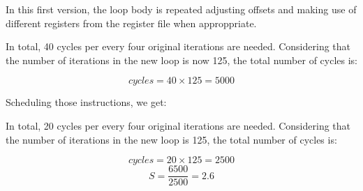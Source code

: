In this first version, the loop body is repeated adjusting offsets
and making use of different registers from the register file when approppriate.

In total, 40 cycles per every four original iterations are needed.
Considering that the number of iterations in the new loop is now 125,
the total number of cycles is:

\[
cycles = 40 \times 125 = 5000
\]

Scheduling those instructions, we get:



In total, 20 cycles per every four original iterations are needed.
Considering that the number of iterations in the new loop is 125,
the total number of cycles is:

\[
cycles = 20 \times 125 = 2500
\]
\[
S = \frac{6500}{2500} = 2.6
\]
